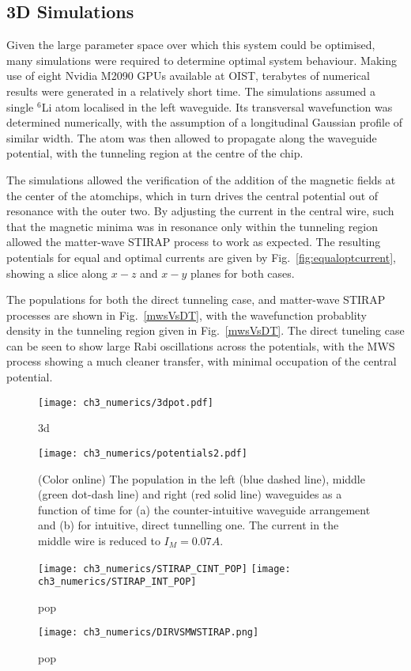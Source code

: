 \subsection{3D Simulations}
\label{sec:Results}

Given the large parameter space over which this system could be optimised, many simulations were required to determine optimal system behaviour. Making use of eight Nvidia M2090 GPUs available at OIST, terabytes of numerical results were generated in a relatively short time. The simulations assumed a single $^{6}$Li atom localised in the left waveguide. Its transversal wavefunction was determined numerically, with the assumption of a longitudinal Gaussian profile of similar width. The atom was then allowed to propagate along the waveguide potential, with the tunneling region at the centre of the chip.

The simulations allowed the verification of the addition of the magnetic fields at the center of the atomchips, which in turn drives the central potential out of resonance with the outer two. By adjusting the current in the central wire, such that the magnetic minima was in resonance only within the tunneling region allowed the matter-wave STIRAP process to work as expected. The resulting potentials for equal and optimal currents are given by Fig.~\ref{fig:equaloptcurrent}, showing a slice along $x-z$ and $x-y$ planes for both cases.

The populations for both the direct tunneling case, and matter-wave STIRAP processes are shown in Fig.~\ref{mwsVsDT}, with the wavefunction probablity density in the tunneling region given in Fig.~\ref{mwsVsDT}. The direct tuneling case can be seen to show large Rabi oscillations across the potentials, with the MWS process showing a much cleaner transfer, with minimal occupation of the central potential.

\begin{figure}[tb]
    \centering
  \texttt{[image: ch3\_numerics/3dpot.pdf]}
  \caption{3d}
  \label{fig:Populations}
\end{figure}

\begin{figure}[tb]
    \centering
  \texttt{[image: ch3\_numerics/potentials2.pdf]}
  \caption{(Color online) The population in the left (blue dashed line), middle (green dot-dash line) and right (red solid line) waveguides as a function of time for (a) the counter-intuitive waveguide arrangement and (b) for intuitive, direct tunnelling one. The current in the middle wire is reduced to $I_M=0.07 A$.}
  \label{fig:Populations}
\end{figure}

\begin{figure}[tb]
    \centering
  \texttt{[image: ch3\_numerics/STIRAP\_CINT\_POP]}
  \texttt{[image: ch3\_numerics/STIRAP\_INT\_POP]}
  \caption{pop}
  \label{fig:Populations}
\end{figure}

\begin{figure}[tb]
    \centering
  \texttt{[image: ch3\_numerics/DIRVSMWSTIRAP.png]}
  \caption{pop}
  \label{fig:Populations}
\end{figure}
